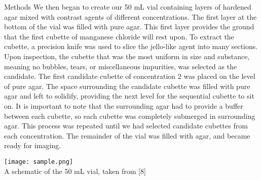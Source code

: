 \documentclass[a4paper,12pt]{article}
\begin{document}
\begin{section}{Methods}
We then began to create our 50 mL vial containing layers of hardened agar mixed with contrast agents of different concentrations. The first layer at the bottom of the vial was filled with pure agar. This first layer provides the ground that the first cubette of manganese chloride will rest upon. To extract the cubette, a precision knife was used to slice the jello-like agent into many sections. Upon inspection, the cubette that was the most uniform in size and substance, meaning no bubbles, tears, or miscellaneous impurities, was selected as the candidate. The first candidate cubette of concentration 2 was placed on the level of pure agar. The space surrounding the candidate cubette was filled with pure agar and left to solidify, providing the next level for the sequential cubette to sit on. It is important to note that the surrounding agar had to provide a buffer between each cubette, so each cubette was completely submerged in surrounding agar. This process was repeated until we had selected candidate cubettes from each concentration. The remainder of the vial was filled with agar, and became ready for imaging. \\


\begin{center}
\texttt{[image: sample.png]} \\
\small{A schematic of the 50 mL vial, taken from [8]}
\end{center}

\end{section}
\end{document}
